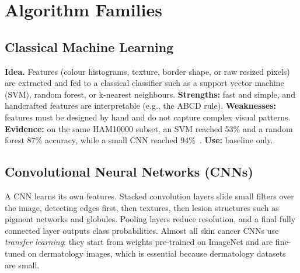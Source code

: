\documentclass[10pt,a4paper]{article}
\begin{document}
\section{Algorithm Families}

\subsection{Classical Machine Learning}
\textbf{Idea.} Features (colour histograms, texture, border shape, or
raw resized pixels) are extracted and fed to a classical classifier
such as a support vector machine (SVM), random forest, or k-nearest
neighbours. \textbf{Strengths:} fast and simple, and handcrafted
features are interpretable (e.g., the ABCD rule). \textbf{Weaknesses:}
features must be designed by hand and do not capture complex visual
patterns. \textbf{Evidence:} on the same HAM10000 subset, an SVM reached
53\% and a random forest 87\% accuracy, while a small CNN reached
94\%~\cite{shetty2022}. \textbf{Use:} baseline only.

\subsection{Convolutional Neural Networks (CNNs)}
A CNN learns its own features. Stacked convolution layers slide small
filters over the image, detecting edges first, then textures, then
lesion structures such as pigment networks and globules. Pooling layers
reduce resolution, and a final fully connected layer outputs class
probabilities. Almost all skin cancer CNNs use \emph{transfer
learning}: they start from weights pre-trained on ImageNet and are
fine-tuned on dermatology images, which is essential because
dermatology datasets are small.
\end{document}
